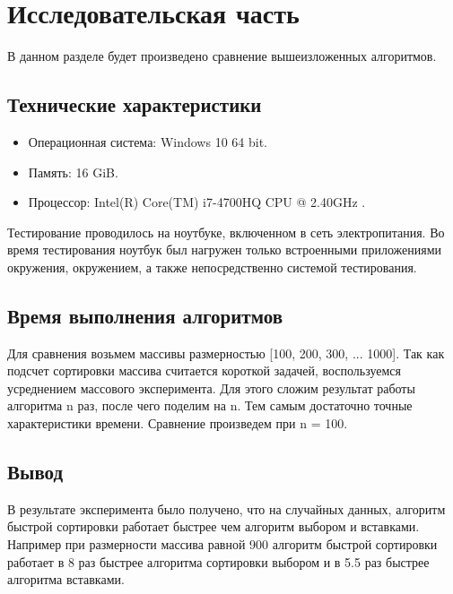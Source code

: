 \chapter{Исследовательская часть}

В данном разделе будет произведено сравнение вышеизложенных алгоритмов.

\section{Технические характеристики}

\begin{itemize}
	\item Операционная система: Windows 10 64 bit. \cite{windows}
	\item Память: 16 GiB.
	\item Процессор: Intel(R) Core(TM) i7-4700HQ CPU @ 2.40GHz \cite{intel}.
\end{itemize}

Тестирование проводилось на ноутбуке, включенном в сеть электропитания. Во время тестирования ноутбук был нагружен только встроенными приложениями окружения, окружением, а также непосредственно системой тестирования.

\section{Время выполнения алгоритмов}

Для сравнения возьмем массивы размерностью [100, 200, 300, ... 1000]. Так как подсчет сортировки массива считается короткой задачей, воспользуемся усреднением массового эксперимента. Для этого сложим результат работы алгоритма n раз, после чего поделим на n. Тем самым достаточно точные характеристики времени. Сравнение произведем при n = 100. 


\clearpage
{}
\clearpage
{}


\section*{Вывод}
В результате эксперимента было получено, что на случайных данных, алгоритм быстрой сортировки работает быстрее чем алгоритм выбором и вставками. Например при размерности массива равной 900 алгоритм быстрой сортировки работает в 8 раз быстрее алгоритма сортировки выбором и в 5.5 раз быстрее алгоритма вставками. 